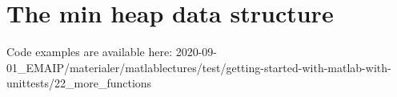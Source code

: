 \section{The min heap data structure}


Code examples are available here: 
2020-09-01\_EMAIP/materialer/matlablectures/test/getting-started-with-matlab-with-unittests/22\_more\_functions
 